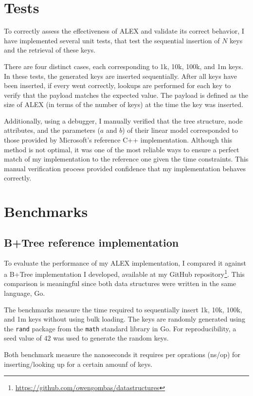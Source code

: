 \let\clearpage\relax
\chapter{Tests}
To correctly assess the effectiveness of ALEX and validate its correct behavior, I have implemented several unit tests, that test the sequential insertion of $N$ keys and the retrieval of these keys.

There are four distinct cases, each corresponding to 1k, 10k, 100k, and 1m keys. In these tests, the generated keys are inserted sequentially. After all keys have been inserted, if every went correctly, lookups are performed for each key to verify that the payload matches the expected value. The payload is defined as the size of ALEX (in terms of the number of keys) at the time the key was inserted.

Additionally, using a debugger, I manually verified that the tree structure, node attributes, and the parameters ($a$ and $b$) of their linear model corresponded to those provided by Microsoft's reference C++ implementation. Although this method is not optimal, it was one of the most reliable ways to ensure a perfect match of my implementation to the reference one given the time constraints. This manual verification process provided confidence that my implementation behaves correctly.

\let\clearpage\relax
\chapter{Benchmarks}
\section{B+Tree reference implementation}

To evaluate the performance of my ALEX implementation, I compared it against a B+Tree implementation I developed, available at my GitHub repository\footnote{\url{https://github.com/owengombas/datastructures}}. This comparison is meaningful since both data structures were written in the same language, Go.

The benchmarks measure the time required to sequentially insert 1k, 10k, 100k, and 1m keys without using bulk loading. The keys are randomly generated using the \texttt{rand} package from the \texttt{math} standard library in Go. For reproducibility, a seed value of $42$ was used to generate the random keys.

Both benchmark measure the nanoseconds it requires per oprations (ns/op) for inserting/looking up for a certain amounf of keys.

